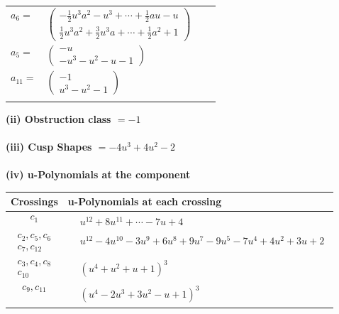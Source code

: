 \documentclass[1p]{elsarticle_modified}
\theoremstyle{definition}
\begin{document}
\begin{tabular}{m{7pt} m{180pt} m{7pt} m{180pt} }
\flushright $a_{6}=$&$\begin{pmatrix}-\frac{1}{2} u^3 a^2- u^3+\cdots+\frac{1}{2} a u- u\\\frac{1}{2} u^3 a^2+\frac{3}{2} u^3 a+\cdots+\frac{1}{2} a^2+1\end{pmatrix}$ \\
\flushright $a_{5}=$&$\begin{pmatrix}- u\\- u^3- u^2- u-1\end{pmatrix}$ \\
\flushright $a_{11}=$&$\begin{pmatrix}-1\\u^3- u^2-1\end{pmatrix}$\\&\end{tabular}
\flushleft \textbf{(ii) Obstruction class $= -1$}\\~\\
\flushleft \textbf{(iii) Cusp Shapes $= -4 u^3+4 u^2-2$}\\~\\
\newpage\renewcommand{\arraystretch}{1}
\flushleft \textbf{(iv) u-Polynomials at the component}\newline \\
\begin{tabular}{m{50pt}|m{274pt}}
Crossings & \hspace{64pt}u-Polynomials at each crossing \\
\hline $$\begin{aligned}c_{1}\end{aligned}$$&$\begin{aligned}
&u^{12}+8 u^{11}+\cdots-7 u+4
\end{aligned}$\\
\hline $$\begin{aligned}c_{2},c_{5},c_{6}\\c_{7},c_{12}\end{aligned}$$&$\begin{aligned}
&u^{12}-4 u^{10}-3 u^9+6 u^8+9 u^7-9 u^5-7 u^4+4 u^2+3 u+2
\end{aligned}$\\
\hline $$\begin{aligned}c_{3},c_{4},c_{8}\\c_{10}\end{aligned}$$&$\begin{aligned}
&(u^4+u^2+u+1)^3
\end{aligned}$\\
\hline $$\begin{aligned}c_{9},c_{11}\end{aligned}$$&$\begin{aligned}
&(u^4-2 u^3+3 u^2- u+1)^3
\end{aligned}$\\
\hline
\end{tabular}\\~\\
\end{document}
